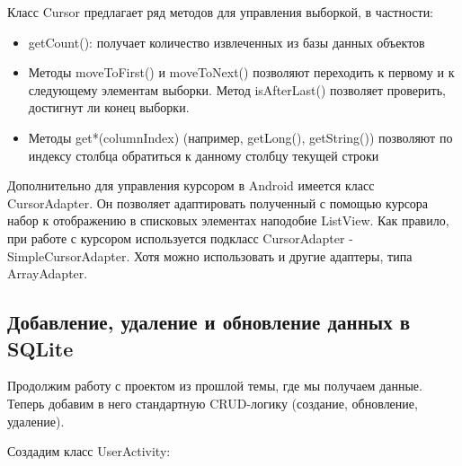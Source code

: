Класс Cursor предлагает ряд методов для управления выборкой, в частности:
\begin{itemize}
	\item getCount(): получает количество извлеченных из базы данных
		объектов
	\item Методы moveToFirst() и moveToNext() позволяют переходить к
		первому и к следующему элементам выборки. Метод isAfterLast()
		позволяет проверить, достигнут ли конец выборки.
	\item Методы get*(columnIndex) (например, getLong(), getString())
		позволяют по индексу столбца обратиться к данному столбцу
		текущей строки
\end{itemize}

Дополнительно для управления курсором в Android имеется класс
CursorAdapter. Он позволяет адаптировать полученный с помощью курсора
набор к отображению в списковых элементах наподобие ListView. Как
правило, при работе с курсором используется подкласс CursorAdapter -
SimpleCursorAdapter. Хотя можно использовать и другие адаптеры, типа
ArrayAdapter.

\subsection{Добавление, удаление и обновление данных в SQLite}
Продолжим работу с проектом из прошлой темы, где мы получаем данные.
Теперь добавим в него стандартную CRUD-логику (создание, обновление,
удаление).\par
Создадим класс UserActivity:

